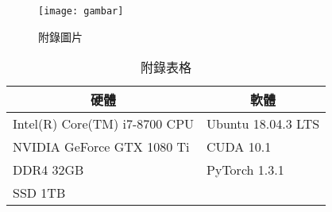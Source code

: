 


\begin{figure}[h]
  \centerline{\texttt{[image: gambar]}}
  \caption*{附錄圖片}
  \label{fig:apxf1}
\end{figure}

\begin{table}[h]
    \centering
    \caption*{附錄表格}
    \label{table:apxt1}
    \begin{tabular}{p{}p{}}
        \hline
        \multicolumn{1}{c}{\textbf{硬體}} & \multicolumn{1}{c}{\textbf{軟體}} \\ \hline
        Intel(R) Core(TM) i7-8700 CPU      & Ubuntu 18.04.3 LTS               \\
        NVIDIA GeForce GTX 1080 Ti         & CUDA 10.1                        \\
        DDR4 32GB                          & PyTorch 1.3.1                    \\
        SSD 1TB                            &                                  \\ \hline
    \end{tabular}
\end{table}